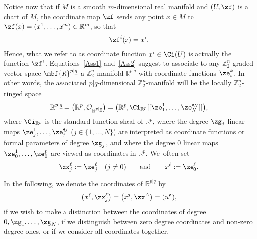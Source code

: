 \documentclass[10pt,a4paper]{amsart}
\newcommand{\R}{{\mathbb R}}
\newcommand{\Z}{{\mathbb Z}}
\def\ul{\underline}
\def\cO{\mathcal{O}}
\def\ul{\underline}
\newcommand{\0}{\otimes}
\numberwithin{equation}{section}
\begin{document}
Notice now that if $M$ is a smooth $m$-dimensional real manifold and $(U,\zf)$ is a chart of $M$, the coordinate map $\zf$ sends any point $x\in M$ to $\zf(x)=(x^1,\dots,x^m)\in\R^m$, so that
\begin{gather}\label{Ass2}
\zf^i(x)=x^i.
\end{gather}
Hence, what we refer to as coordinate function $x^i\in\Ci(U)$ is actually the function $\zf^i$. Equations~\eqref{Ass1} and~\eqref{Ass2} suggest to associate to any $\Z_2^n$-graded vector space $\mbf{R}^{p|\ul q}$ a $\Z_2^n$-manifold $\R^{p|\ul q}$ with coordinate functions $\ze^k_i$. In other words, the associated $p|\ul q$-dimensional $\Z_2^n$-manifold will be the locally $\Z_2^n$-ringed space
\[
\R^{p|\ul q}=\big(\R^p,\cO_{\R^{p|\ul q}}\big)=\big(\R^p, \Ci_{\R^p}[[\ze_1^1,\dots,\ze_N^{q_N}]]\big),
\]
where $\Ci_{\R^p}$ is the standard function sheaf of $\R^p$, where the degree $\zg_j$ linear maps $\ze_j^1,\dots,\ze_j^{q_j}$ ($j\in\{1,\dots,N\}$) are interpreted as coordinate functions or formal parameters of degree $\zg_j$, and where the degree $0$ linear maps $\ze_0^1,\dots,\ze_0^{p}$ are viewed as coordinates in $\R^{p}$. We~often set
\begin{gather}\label{Equiv}
\zx^\ell_j:=\ze^\ell_j\quad (j\neq 0)\qquad\text{and}\qquad x^\ell := \ze^\ell_0.
\end{gather}

\begin{Remark}
In the following, we denote the coordinates of $\R^{p|\ul q}$ by
\[
\big(x^\ell,\zx_j^\ell\big)=\big(x^a,\zx^A\big)=(u^{\mathfrak{a}}),
\]
if we wish to make a distinction between the coordinates of degree $0,\zg_1,\dots,\zg_N$, if we distinguish between zero degree coordinates and non-zero degree ones, or if we consider all coordinates together.
\end{Remark}
\end{document}
